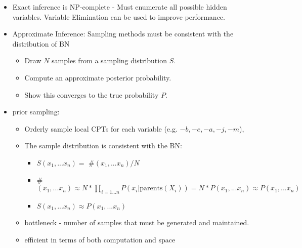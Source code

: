 \documentclass[10pt]{article}
\begin{document}
\begin{itemize}[label=\(\star\), leftmargin=1em, itemsep=-0.3em]
          \begin{itemize}[label=\(\star\), leftmargin=5em, itemsep=-0.2em]
              \item[] $P (B|+j,+m) \propto P(B,+j,+m) = \sum a,e P(B,+j,+m, a, e) = \sum a,e P(B)P(e)P(a|B,e)P(+j|a)P(+m|a)$
              \item[] $= P(B)P(+e)P(+a|B,+e)P(+j|+a)P(+m|+a) +P(B)P(+e)P(-a|B,+e)P(+j|-a)P(+m|-a) +P(B)P(-e)P(+a|B,-e)P(+j|+a)P(+m|+a)  +P(B)P(-e)P(-a|B,-e)P(+j|-a)P(+m|-a) $
          \end{itemize}
    \item Exact inference is NP-complete -  Must enumerate all possible hidden variables. Variable Elimination can be used to improve performance.
    \item Approximate Inference: Sampling methods must be consistent with the distribution of BN
          \begin{itemize}[label=\(\star\), leftmargin=5em, itemsep=-0.2em]
              \item Draw $N$ samples from a sampling distribution $S$.
              \item Compute an approximate posterior probability.
              \item Show this converges to the true probability $P$.
          \end{itemize}
    \item prior sampling:
          \begin{itemize}[label=\(\star\), leftmargin=5em, itemsep=-0.2em]
              \item Orderly sample local CPTs for each variable (e.g. $-b, -e, -a, -j, -m$),
              \item The sample distribution is consistent with the BN:

                    \begin{itemize}[label=\(\star\), leftmargin=5em, itemsep=-0.2em]
                        \item[] $S(x_1, ... x_n) =$ \#$(x_1, ... x_n) / N$

                        \item[] \#$(x_1, ... x_n)\approx  N * \prod_{i=1...n} P(x_i|\text{parents}(X_i)) = N * P(x_1, ... x_n) \approx P(x_1, ... x_n)$
                        \item[] $S(x_1, ... x_n) \approx P(x_1, ... x_n)$

                    \end{itemize}
              \item bottleneck - number of samples that must be generated and maintained.
              \item efficient in terms of both computation and space
          \end{itemize}


\end{itemize}
\end{document}
